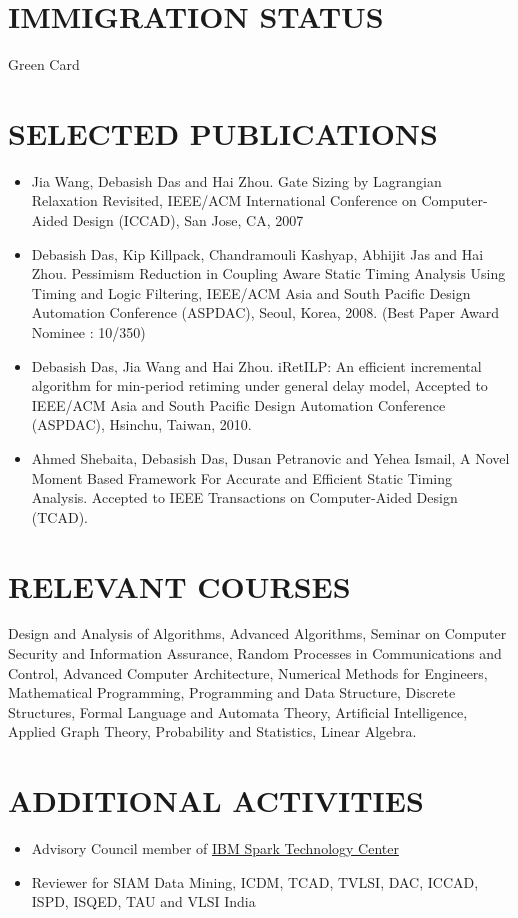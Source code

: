 \documentclass[margin]{res}
\begin{document}
\begin{resume}
\section{IMMIGRATION STATUS}
Green Card

\section{SELECTED PUBLICATIONS}
\begin{itemize} \itemsep -2pt
\item Jia Wang, Debasish Das and Hai Zhou. Gate Sizing by Lagrangian Relaxation Revisited, IEEE/ACM 
  International Conference on Computer-Aided Design (ICCAD), San Jose, CA, 2007
\item Debasish Das, Kip Killpack, Chandramouli Kashyap, Abhijit Jas and Hai Zhou. Pessimism Reduction in
  Coupling Aware Static Timing Analysis Using Timing and Logic Filtering, IEEE/ACM Asia and South Pacific 
  Design Automation Conference (ASPDAC), Seoul, Korea, 2008. (Best Paper Award Nominee : 10/350)
\item Debasish Das, Jia Wang and Hai Zhou. iRetILP: An efficient incremental algorithm for min-period
  retiming under general delay model, Accepted to IEEE/ACM Asia and South Pacific 
  Design Automation Conference (ASPDAC), Hsinchu, Taiwan, 2010.
\item Ahmed Shebaita, Debasish Das, Dusan Petranovic and Yehea Ismail, A Novel Moment Based Framework For
  Accurate and Efficient Static Timing Analysis. Accepted to IEEE Transactions on Computer-Aided Design (TCAD).
\end{itemize}

\section{RELEVANT COURSES}
Design and Analysis of Algorithms, Advanced Algorithms, Seminar on Computer Security and Information Assurance, 
Random Processes in Communications and Control, Advanced Computer
Architecture, Numerical Methods for Engineers, 
Mathematical Programming, Programming and Data Structure, Discrete Structures,
Formal Language and Automata Theory, Artificial Intelligence, Applied Graph Theory, Probability and Statistics, Linear Algebra.

\section{ADDITIONAL ACTIVITIES}
\begin{itemize} \itemsep -2pt
\item Advisory Council member of \href{http://www.spark.tc/}{IBM Spark Technology Center} 
\item Reviewer for SIAM Data Mining, ICDM, TCAD, TVLSI, DAC, ICCAD, ISPD, ISQED, TAU and VLSI India
\end{itemize}

\end{resume}
\end{document}
